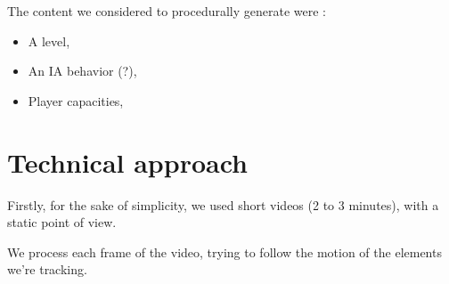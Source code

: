 \documentclass[conference]{acmsiggraph}
\begin{document}
The content we considered to procedurally generate were :
\begin{itemize}
	\item A level,
	\item An IA behavior (?),
	\item Player capacities,
\end{itemize}

\section{Technical approach}

Firstly, for the sake of simplicity, we used short videos (2 to 3 minutes), with a static point of view.

We process each frame of the video, trying to follow the motion of the elements we're tracking.


\nocite{*}

\end{document}
